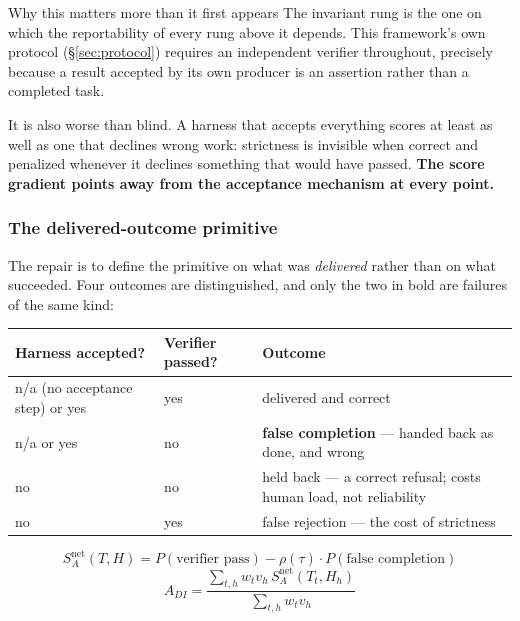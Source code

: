 \documentclass[11pt]{article}
\theoremstyle{definition}
\begin{document}
\begin{cautionbox}{Why this matters more than it first appears}
The invariant rung is the one on which the reportability of every rung above it depends. This framework's own protocol (\S\ref{sec:protocol}) requires an independent verifier throughout, precisely because a result accepted by its own producer is an assertion rather than a completed task.

It is also worse than blind. A harness that accepts everything scores at least as well as one that declines wrong work: strictness is invisible when correct and penalized whenever it declines something that would have passed. \textbf{The score gradient points away from the acceptance mechanism at every point.}
\end{cautionbox}

\subsubsection{The delivered-outcome primitive}

The repair is to define the primitive on what was \emph{delivered} rather than on what succeeded. Four outcomes are distinguished, and only the two in bold are failures of the same kind:

\begin{table}[h]
\centering\small
\begin{tabularx}{\textwidth}{@{}llY@{}}
\toprule
Harness accepted? & Verifier passed? & Outcome \\
\midrule
n/a (no acceptance step) or yes & yes & delivered and correct \\
n/a or yes & no & \textbf{false completion} --- handed back as done, and wrong \\
no & no & held back --- a correct refusal; costs human load, not reliability \\
no & yes & false rejection --- the cost of strictness \\
\bottomrule
\end{tabularx}
\end{table}

\begin{equation}
S^{\text{net}}_A(T,H) = P(\text{verifier pass}) - \rho(\tau)\cdot P(\text{false completion})
\label{eq:net}
\end{equation}
\begin{equation}
A_{DI} = \frac{\sum_{t,h} w_t v_h\, S^{\text{net}}_A(T_t,H_h)}{\sum_{t,h} w_t v_h}
\end{equation}
\end{document}
